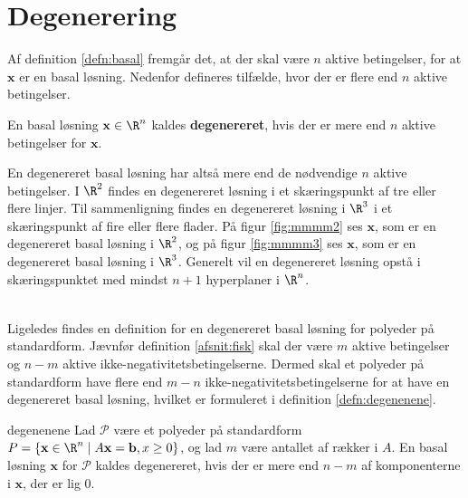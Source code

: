 \section{Degenerering}
Af definition \ref{defn:basal} fremgår det, at der skal være $n$ aktive betingelser, for at $\mathbf{x}$ er en basal løsning. 
Nedenfor defineres tilfælde, hvor der er flere end $n$ aktive betingelser. 
%
\begin{defn}{}{}
En basal løsning $\mathbf{x} \in \R^n$ kaldes \textbf{degenereret}, hvis der er mere end $n$ aktive betingelser for $\mathbf{x}$.
\end{defn}
\noindent
%
En degenereret basal løsning har altså mere end de nødvendige $n$ aktive betingelser.
% 
I $\R^2$ findes en degenereret løsning i et skæringspunkt af tre eller flere linjer. 
Til sammenligning findes en degenereret løsning i $\R^3$ i et skæringspunkt af fire eller flere flader. 
På figur \ref{fig:mmmm2} ses $\mathbf{x}$, som er en degenereret basal løsning i $\R^2$, og på figur  \ref{fig:mmmm3} ses $\mathbf{x}$, som er en degenereret basal løsning i $\R^3$.
Generelt vil en degenereret løsning opstå i skæringspunktet med mindst $n+1$ hyperplaner i $\R^n$.
%
%
\begin{center}
$
\begin{array}{cc}
&

\end{array}
$
\end{center}
%
%
Ligeledes findes en definition for en degenereret basal løsning for polyeder på standardform. 
Jævnfør definition \ref{afsnit:fisk} skal der være $m$ aktive betingelser og $n-m$ aktive ikke-negativitetsbetingelserne. 
Dermed skal et polyeder på standardform have flere end $m-n$ ikke-negativitetsbetingelserne for at have en degenereret basal løsning, hvilket er formuleret i definition \ref{defn:degenenene}. 
%
\begin{defn}{}{degenenene}
Lad $\mathcal{P}$ være et polyeder på standardform
$P=\{ \mathbf{x} \in \R^n \mid A \mathbf{x}=\mathbf{b},x \geq 0 \}$, og lad $m$ være antallet af rækker i $A$.
En basal løsning $\mathbf{x}$ for $\mathcal{P}$ kaldes degenereret, hvis der er mere end $n-m$ af komponenterne i $\mathbf{x}$, der er lig $0$.
\end{defn}
%
